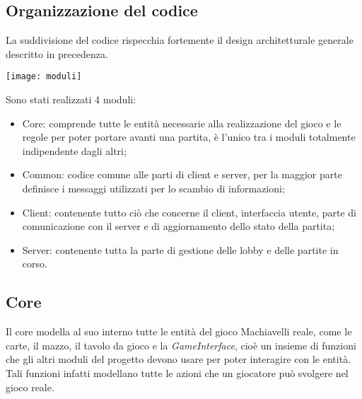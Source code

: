 \subsection{Organizzazione del codice}
La suddivisione del codice rispecchia fortemente il design architetturale generale descritto in precedenza.
\begin{center}
    \texttt{[image: moduli]}
\end{center}
Sono stati realizzati 4 moduli:
\begin{itemize}
    \item Core: comprende tutte le entità necessarie alla realizzazione del gioco e le regole per poter portare avanti una partita, è l’unico tra i moduli totalmente indipendente dagli altri;
    \item Common: codice comune alle parti di client e server, per la maggior parte definisce i messaggi utilizzati per lo scambio di informazioni;
    \item Client: contenente tutto ciò che concerne il client, interfaccia utente, parte di comunicazione con il server e di aggiornamento dello stato della partita;
    \item Server: contenente tutta la parte di gestione delle lobby e delle partite in corso.
\end{itemize}
\subsection{Core}
Il core modella al suo interno tutte le entità del gioco Machiavelli reale, come le carte, il mazzo, il tavolo da gioco e la \textit{GameInterface}, cioè un insieme di funzioni che gli altri moduli del progetto devono usare per poter interagire con le entità. Tali funzioni infatti modellano tutte le azioni che un giocatore può svolgere nel gioco reale.
